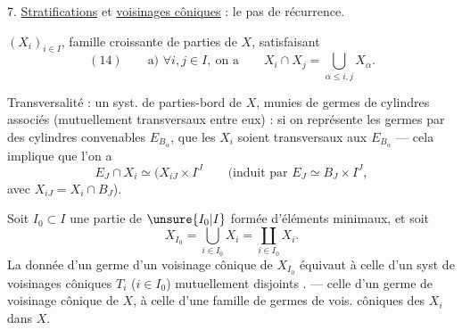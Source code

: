 7. \uline{Stratifications} et \uline{voisinages côniques} : le pas
de récurrence.

$(X_i)_{i\in I}$, famille croissante de parties de $X$,
satisfaisant
\[
(14)\qquad\text{a) }\forall i,j\in I,\ \text{on a}\qquad
X_i\cap X_j=\bigcup_{\alpha\le i,j}X_\alpha.
\]


Transversalité : un syst. de parties-bord  de
$X$, munies de germes de cylindres associés
(mutuellement transversaux entre eux) : si on
représente les germes par des cylindres convenables
$E_{B_\alpha}$,  que les $X_i$ soient transversaux
aux $E_{B_\alpha}$ --- cela implique que l'on a
\[
E_J\cap X_i\simeq (X_{iJ}\times I^J
\qquad
\text{(induit par }E_J\simeq B_J\times I^J,
\]
avec $X_{iJ}=X_i\cap B_J$).

Soit $I_0\subset I$ une partie de $\unsure{I_0|I}$ formée
d'éléments minimaux,  et soit
\[
X_{I_0}=\bigcup_{i\in I_0}X_i=\coprod_{i\in I_0}X_i.
\]
La donnée d'un germe 
d'un voisinage cônique  de $X_{I_0}$ équivaut à
celle d'un syst de voisinages côniques
$T_i$ ($i\in I_0$) mutuellement disjoints . ---
celle d'un germe de voisinage cônique de $X$,
à celle d'une famille de germes de vois.
côniques des $X_i$ dans $X$.
